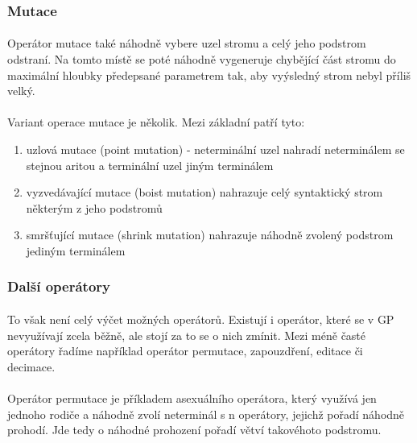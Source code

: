 \documentclass[bc,male,java,dept460]{diploma}		%
\begin{document}
\subsubsection{Mutace}
\paragraph*{}
Operátor mutace také náhodně vybere uzel stromu a celý jeho podstrom odstraní. Na tomto místě se poté náhodně vygeneruje chybějící část stromu do maximální hloubky předepsané parametrem tak, aby vyýsledný strom nebyl příliš velký. 


\paragraph*{}
Variant operace mutace je několik. Mezi základní patří tyto:
\begin{enumerate}
\item uzlová mutace (point mutation) - neterminální uzel nahradí neterminálem se stejnou aritou a terminální uzel jiným terminálem
\item vyzvedávající mutace (boist mutation) nahrazuje celý syntaktický strom některým z jeho podstromů
\item smršťující mutace (shrink mutation) nahrazuje náhodně zvolený podstrom jediným terminálem
\end{enumerate}

\subsubsection{Další operátory}
\paragraph*{}
To však není celý výčet možných operátorů. Existují i operátor, které se v GP nevyužívají zcela běžně, ale stojí za to se o nich zmínit. Mezi méně časté operátory řadíme například operátor permutace, zapouzdření, editace či decimace.

\paragraph*{}
Operátor permutace je příkladem asexuálního operátora, který využívá jen jednoho rodiče a náhodně zvolí neterminál s n operátory, jejichž pořadí náhodně prohodí. Jde tedy o náhodné prohození pořadí větví takovéhoto podstromu.
\end{document}
